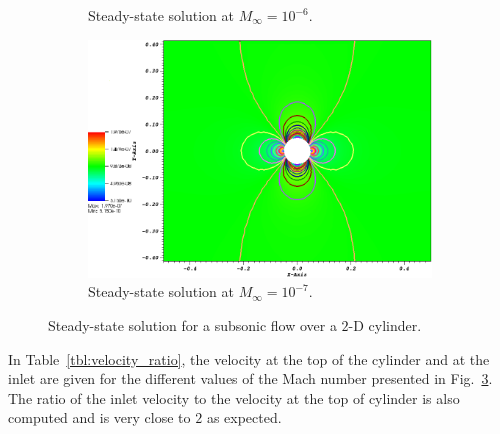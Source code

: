 \documentclass[preprint,10pt]{elsarticle}
\newcommand{\fig}[1]{Fig.~\ref{#1}}                      %
\newcommand{\tbl}[1]{Table~\ref{#1}}                     %
\begin{document}
\begin{figure}[H]
\begin{subfigure}[b]{0.495\textwidth}
                \caption{Steady-state solution at $M_\infty=10^{-6}$.}
                \label{fig:cyl_1em6}
        \end{subfigure}
        \begin{subfigure}[b]{0.495\textwidth}
                \centering
                \includegraphics[width=\textwidth]{CylinderMach1em7ZoomIn.png}
                \caption{Steady-state solution at $M_\infty=10^{-7}$.}
                \label{fig:cyl_1em7}
        \end{subfigure}
        \caption{Steady-state solution for a subsonic flow over a $2$-D cylinder.}\label{fig:cylinder}
\end{figure}
In \tbl{tbl:velocity_ratio}, the velocity at the top of the cylinder and at the inlet are given for the different values of the Mach number presented in \fig{fig:cylinder}. The ratio of the inlet velocity to the velocity at the top of cylinder is also computed and is very close to $2$ as expected.
\end{document}
